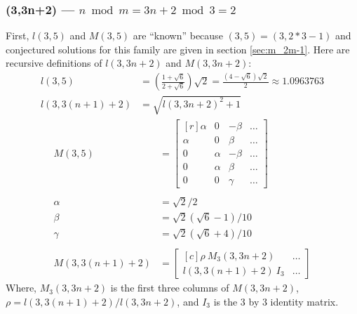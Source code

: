 \documentclass[12pt,titlepage]{article}
\begin{document}
\subsubsection{(3,3n+2) --- $n \bmod m = 3n+2 \bmod 3 = 2$}
First, $l(3,5)$ and $M(3,5)$ are ``known'' because $(3,5) = (3,2*3-1)$ and
conjectured solutions for this family are given in section \ref{sec:m_2m-1}.
Here are recursive definitions of $l(3,3n+2)$ and $M(3,3n+2)$:
\begin{align*}
l(3,5)        &= \left(\frac{1+\sqrt{6}}{2+\sqrt{6}}\right) \sqrt{2}
               = \frac{(4-\sqrt{6}) \sqrt{2}}{2}
               \approx 1.0963763        \\
l(3,3(n+1)+2) &= \sqrt{l(3,3n+2)^2 + 1}
\end{align*}
\begin{align*}
M(3,5) &=
\begin{bmatrix*}[r]
\alpha & 0      & -\beta  & \ldots \\
\alpha & 0      &  \beta  & \ldots \\
0      & \alpha & -\beta  & \ldots \\
0      & \alpha &  \beta  & \ldots \\
0      & 0      &  \gamma & \ldots
\end{bmatrix*} \\
& \\
\alpha &= \sqrt{2}/2                \\
\beta  &= \sqrt{2}(\sqrt{6} - 1)/10 \\
\gamma &= \sqrt{2}(\sqrt{6} + 4)/10 \\
& \\
M(3,3(n+1)+2) &=
\begin{bmatrix*}[c]
\rho~M_3(3,3n+2)  & \ldots \\
l(3,3(n+1)+2)~I_3 & \ldots
\end{bmatrix*}
\end{align*}
Where, $M_3(3,3n+2)$ is the first three columns of $M(3,3n+2)$,
$\rho = l(3,3(n+1)+2)/l(3,3n+2)$, and $I_3$ is the 3 by 3 identity matrix.
\end{document}
